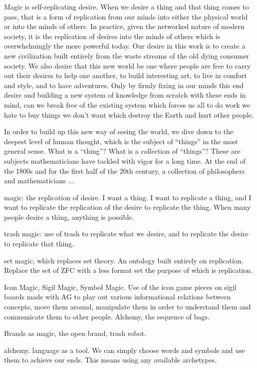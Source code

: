 
Magic is self-replicating desire.  When we desire a thing and that thing comes to pass, that is a form of replication from our minds into either the physical world or into the minds of others.  In practice, given the networked nature of modern society, it is the replication of desires into the minds of others which is overwhelmingly the more powerful today.  Our desire in this work is to create a new civilization built entirely from the waste streams of the old dying consumer society.  We also desire that this new world be one where people are free to carry out their desires to help one another, to build interesting art, to live in comfort and style, and to have adventures.  Only by firmly fixing in our minds this end desire and building a new system of knowledge from scratch with these ends in mind, can we break free of the existing system which forces us all to do work we hate to buy things we don't want which destroy the Earth and hurt other people. 

In order to build up this new way of seeing the world, we dive down to the deepest level of human thought, which is the subject of ``things'' in the most general sense.  What is a ``thing''? What is a collection of ``things''?  These are subjects mathematicians have tackled with vigor for a long time.  At the end of the 1800s and for the first half of the 20th century,  a collection of philosophers and mathematicians ...

magic: the replication of desire.  I want a thing.  I want to replicate a thing, and I want to replicate the replication of the desire to replicate the thing.  When many people desire a thing, anything is possible.  

trash magic: use of trash to replicate what we desire, and to replicate the desire to replicate that thing.

set magic, which replaces set theory.  An ontology built entirely on replication.  Replace the set of ZFC with a less format set the purpose of which is replication.

Icon Magic, Sigil Magic, Symbol Magic.  Use of the icon game pieces on sigil boards made with AG to play out various informational relations between concepts, move them around, manipulate them in order to understand them and communicate them to other people. Alchemy, the sequence of bags.

Brands as magic, the open brand, trash robot.  

alchemy.  language as a tool.  We can simply choose words and symbols and use them to achieve our ends.  This means using any available archetypes. 

